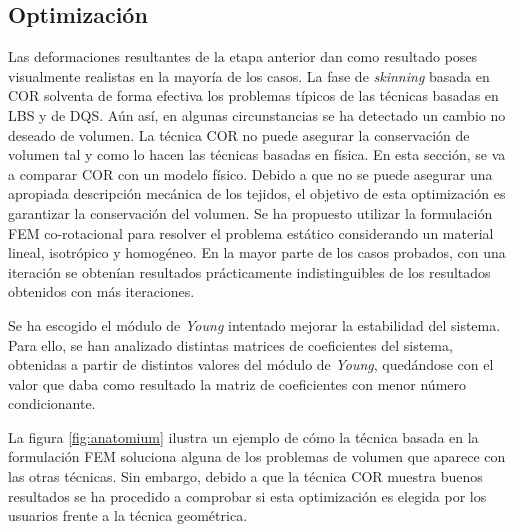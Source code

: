 \subsection{Optimización}

Las deformaciones resultantes de la etapa anterior dan como resultado poses visualmente realistas en la mayoría de los casos. La fase de \emph{skinning} basada en \ac{COR} solventa de forma efectiva los problemas típicos de las técnicas basadas en \ac{LBS} y de \ac{DQS}. Aún así, en algunas circunstancias se ha detectado un cambio no deseado de volumen. 
La técnica \ac{COR} no puede asegurar la conservación de volumen tal y como lo hacen las técnicas basadas en física. En esta sección, se va a comparar \ac{COR} con un modelo físico. Debido a que no se puede asegurar una apropiada descripción mecánica de los tejidos, el objetivo de esta optimización es garantizar la conservación del volumen.  Se ha propuesto utilizar la formulación \ac{FEM} co-rotacional para resolver el problema estático considerando un material lineal, isotrópico y homogéneo. En la mayor parte de los casos probados, con una iteración se obtenían resultados prácticamente indistinguibles de los resultados obtenidos con más iteraciones. 
 
 Se ha escogido el módulo de \emph{Young}  intentado mejorar la estabilidad del sistema. Para ello, se han analizado distintas matrices de coeficientes del sistema, obtenidas a partir de distintos valores del módulo de \emph{Young}, quedándose con el valor que daba como resultado la matriz de coeficientes con menor número condicionante.
 
 La figura \ref{fig:anatomium} ilustra un ejemplo de cómo la técnica basada en la formulación \ac{FEM} soluciona alguna de los problemas de volumen que aparece con las otras técnicas. Sin embargo, debido a que la técnica \ac{COR} muestra buenos resultados se ha procedido a comprobar si esta optimización es elegida por los usuarios frente a la técnica geométrica.
 
